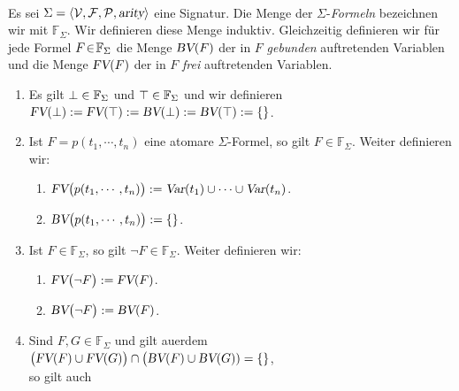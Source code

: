 \begin{Definition} 
\label{praedikaten-formel} \hspace*{\fill} \\
    Es sei $\Sigma = \langle \mathcal{V}, \mathcal{F}, \mathcal{P}, \textsl{arity} \rangle$ eine Signatur.
    Die Menge der $\Sigma$-\emph{Formeln} bezeichnen wir mit $\mathbb{F}_\Sigma$.
    Wir definieren diese Menge induktiv.
    Gleichzeitig definieren wir f\"{u}r jede Formel $F\!\in\! \mathbb{F}_\Sigma$ die Menge $\textsl{BV}(F)$ der in $F$ 
    \emph{gebunden} auftretenden Variablen und die Menge $\textsl{FV}(F)$ der in $F$ \emph{frei} auftretenden Variablen.
    \begin{enumerate}
    \item Es gilt $\bot \in \mathbb{F}_\Sigma$ und $\top \in \mathbb{F}_\Sigma$ und wir definieren \\[0.2cm]
          \hspace*{1.3cm} $\textsl{FV}(\bot) := \textsl{FV}(\top) := \textsl{BV}(\bot) := \textsl{BV}(\top) := \{\}$.
    \item Ist $F = p(t_1,\cdots,t_n)$ eine atomare $\Sigma$-Formel, so gilt $F \in \mathbb{F}_\Sigma$.  Weiter definieren wir:
          \begin{enumerate}
          \item $\textsl{FV}\bigl(p(t_1,\cdots,t_n) \bigr) := \textsl{Var}(t_1) \cup \cdots \cup \textsl{Var}(t_n)$.
          \item $\textsl{BV}\bigl(p(t_1,\cdots,t_n) \bigr) := \{\}$.
          \end{enumerate}
    \item Ist $F \in \mathbb{F}_\Sigma$, so gilt $\neg F \in \mathbb{F}_\Sigma$. Weiter definieren wir:
          \begin{enumerate}
          \item $\textsl{FV}\bigl( \neg F \bigr) := \textsl{FV}(F)$.
          \item $\textsl{BV}\bigl( \neg F \bigr) := \textsl{BV}(F)$.
          \end{enumerate}
    \item Sind $F, G \in \mathbb{F}_\Sigma$ und gilt au\3erdem \\[0.2cm]
          \hspace*{1.3cm}
          $\bigl(\textsl{FV}(F) \cup \textsl{FV}(G)\bigr) \cap \bigl(\textsl{BV}(F) \cup \textsl{BV}(G)) = \{\}$,
          \\[0.2cm]
          so gilt auch
          \begin{enumerate}

\end{enumerate}
\end{enumerate}
\end{Definition}
